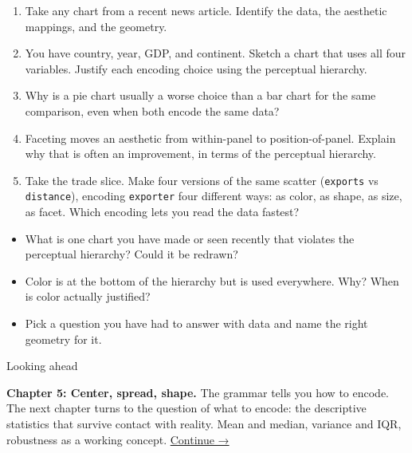 \documentclass[
  letterpaper,
  11pt,
  twoside,
  openany]{scrbook}
\providecommand{\tightlist}{%
  \setlength{\itemsep}{0pt}\setlength{\parskip}{0pt}}
\begin{document}
\begin{enumerate}
\def\labelenumi{\arabic{enumi}.}
\item
  Take any chart from a recent news article. Identify the data, the
  aesthetic mappings, and the geometry.
\item
  You have country, year, GDP, and continent. Sketch a chart that uses
  all four variables. Justify each encoding choice using the perceptual
  hierarchy.
\item
  Why is a pie chart usually a worse choice than a bar chart for the
  same comparison, even when both encode the same data?
\item
  Faceting moves an aesthetic from within-panel to position-of-panel.
  Explain why that is often an improvement, in terms of the perceptual
  hierarchy.
\item
  Take the trade slice. Make four versions of the same scatter
  (\texttt{exports} vs \texttt{distance}), encoding \texttt{exporter}
  four different ways: as color, as shape, as size, as facet. Which
  encoding lets you read the data fastest?
\end{enumerate}

\begin{tcolorbox}[enhanced jigsaw, arc=.35mm, bottomrule=.15mm, bottomtitle=1mm, breakable, colback=white, colbacktitle=quarto-callout-caution-color!10!white, colframe=quarto-callout-caution-color-frame, coltitle=black, left=2mm, leftrule=.75mm, opacityback=0, opacitybacktitle=0.6, rightrule=.15mm, title=\textcolor{quarto-callout-caution-color}{\faFire}\hspace{0.5em}{Reflect before moving on}, titlerule=0mm, toprule=.15mm, toptitle=1mm]

\begin{itemize}
\tightlist
\item
  What is one chart you have made or seen recently that violates the
  perceptual hierarchy? Could it be redrawn?
\item
  Color is at the bottom of the hierarchy but is used everywhere. Why?
  When is color actually justified?
\item
  Pick a question you have had to answer with data and name the right
  geometry for it.
\end{itemize}

\end{tcolorbox}

{Looking ahead}

\textbf{Chapter 5: Center, spread, shape.} The grammar tells you how to
encode. The next chapter turns to the question of what to encode: the
descriptive statistics that survive contact with reality. Mean and
median, variance and IQR, robustness as a working concept.
\href{05-center-spread-shape.qmd}{Continue →}
\end{document}
